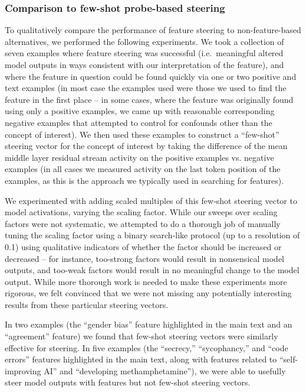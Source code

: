 \documentclass{article}
\begin{document}
\subsubsection{Comparison to few-shot probe-based steering}\label{sec:appendix-methods-steering-compare}

To qualitatively compare the performance of feature steering to non-feature-based alternatives, we performed the following experiments.  We took a collection of seven examples where feature steering was successful (i.e.~meaningful altered model outputs in ways consistent with our interpretation of the feature), and where the feature in question could be found quickly via one or two positive and text examples (in most case the examples used were those we used to find the feature in the first place -- in some cases, where the feature was originally found using only a positive examples, we came up with reasonable corresponding negative examples that attempted to control for confounds other than the concept of interest). We then used these examples to construct a “few-shot” steering vector for the concept of interest by taking the difference of the mean middle layer residual stream activity on the positive examples vs. negative examples (in all cases we measured activity on the last token position of the examples, as this is the approach we typically used in searching for features).

We experimented with adding scaled multiples of this few-shot steering vector to model activations, varying the scaling factor. While our sweeps over scaling factors were not systematic, we attempted to do a thorough job of manually tuning the scaling factor using a binary search-like protocol (up to a resolution of 0.1) using qualitative indicators of whether the factor should be increased or decreased -- for instance, too-strong factors would result in nonsensical model outputs, and too-weak factors would result in no meaningful change to the model output.  While more thorough work is needed to make these experiments more rigorous, we felt convinced that we were not missing any potentially interesting results from these particular steering vectors.

In two examples (the “gender bias” feature highlighted in the main text and an “agreement” feature) we found that few-shot steering vectors were similarly effective for steering. In five examples (the “secrecy,” “sycophancy,” and “code errors” features highlighted in the main text, along with features related to “self-improving AI” and “developing methamphetamine”), we were able to usefully steer model outputs with features but not few-shot steering vectors.
\end{document}
